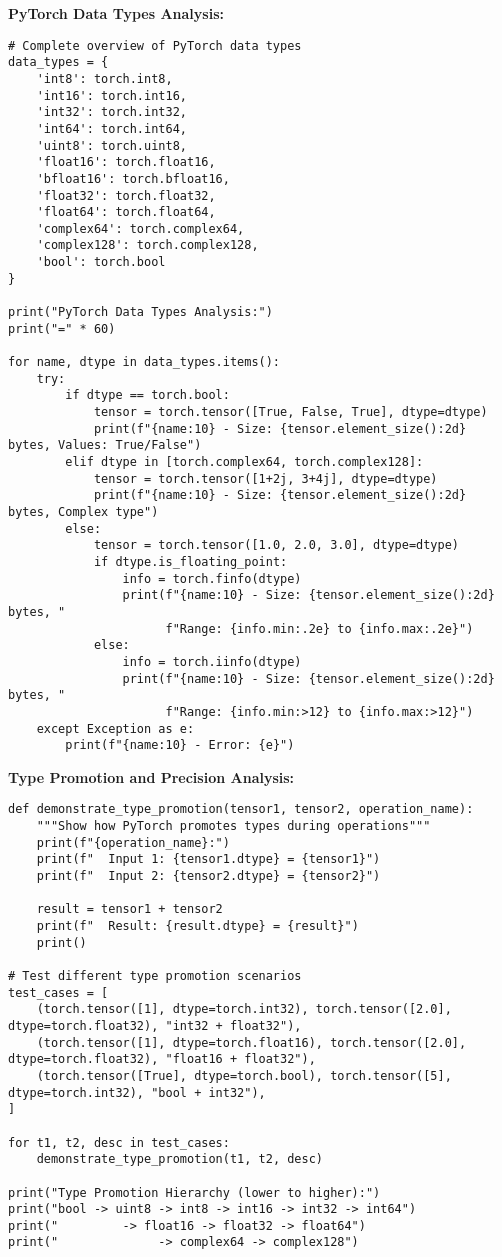 \documentclass[11pt,a4paper]{book}
\begin{document}
\textbf{PyTorch Data Types Analysis:}
\begin{verbatim}
# Complete overview of PyTorch data types
data_types = {
    'int8': torch.int8,
    'int16': torch.int16, 
    'int32': torch.int32,
    'int64': torch.int64,
    'uint8': torch.uint8,
    'float16': torch.float16,
    'bfloat16': torch.bfloat16,
    'float32': torch.float32,
    'float64': torch.float64,
    'complex64': torch.complex64,
    'complex128': torch.complex128,
    'bool': torch.bool
}

print("PyTorch Data Types Analysis:")
print("=" * 60)

for name, dtype in data_types.items():
    try:
        if dtype == torch.bool:
            tensor = torch.tensor([True, False, True], dtype=dtype)
            print(f"{name:10} - Size: {tensor.element_size():2d} bytes, Values: True/False")
        elif dtype in [torch.complex64, torch.complex128]:
            tensor = torch.tensor([1+2j, 3+4j], dtype=dtype)
            print(f"{name:10} - Size: {tensor.element_size():2d} bytes, Complex type")
        else:
            tensor = torch.tensor([1.0, 2.0, 3.0], dtype=dtype)
            if dtype.is_floating_point:
                info = torch.finfo(dtype)
                print(f"{name:10} - Size: {tensor.element_size():2d} bytes, "
                      f"Range: {info.min:.2e} to {info.max:.2e}")
            else:
                info = torch.iinfo(dtype)
                print(f"{name:10} - Size: {tensor.element_size():2d} bytes, "
                      f"Range: {info.min:>12} to {info.max:>12}")
    except Exception as e:
        print(f"{name:10} - Error: {e}")
\end{verbatim}

\textbf{Type Promotion and Precision Analysis:}
\begin{verbatim}
def demonstrate_type_promotion(tensor1, tensor2, operation_name):
    """Show how PyTorch promotes types during operations"""
    print(f"{operation_name}:")
    print(f"  Input 1: {tensor1.dtype} = {tensor1}")
    print(f"  Input 2: {tensor2.dtype} = {tensor2}")
    
    result = tensor1 + tensor2
    print(f"  Result: {result.dtype} = {result}")
    print()

# Test different type promotion scenarios
test_cases = [
    (torch.tensor([1], dtype=torch.int32), torch.tensor([2.0], dtype=torch.float32), "int32 + float32"),
    (torch.tensor([1], dtype=torch.float16), torch.tensor([2.0], dtype=torch.float32), "float16 + float32"),
    (torch.tensor([True], dtype=torch.bool), torch.tensor([5], dtype=torch.int32), "bool + int32"),
]

for t1, t2, desc in test_cases:
    demonstrate_type_promotion(t1, t2, desc)

print("Type Promotion Hierarchy (lower to higher):")
print("bool -> uint8 -> int8 -> int16 -> int32 -> int64")
print("         -> float16 -> float32 -> float64")
print("              -> complex64 -> complex128")
\end{verbatim}
\end{document}
